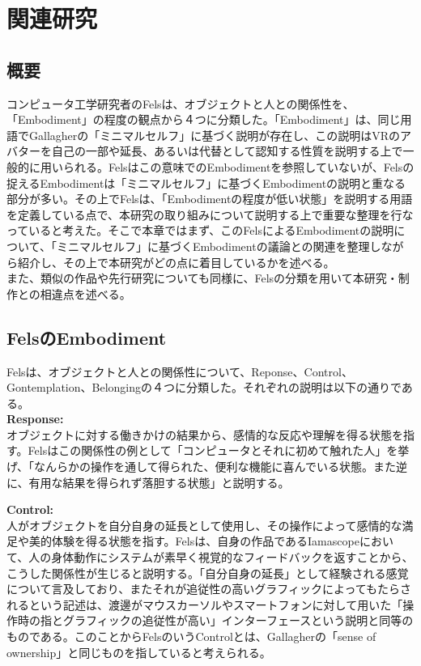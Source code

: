 \chapter{関連研究}
\label{related_works}
\section{概要}
コンピュータ工学研究者のFelsは、オブジェクトと人との関係性を、「Embodiment」の程度の観点から４つに分類した\cite{Fels}。「Embodiment」は、同じ用語でGallagher\cite{Gallagher2000}の「ミニマルセルフ」に基づく説明が存在し、この説明はVRのアバターを自己の一部や延長、あるいは代替として認知する性質を説明する上で一般的に用いられる。Felsはこの意味でのEmbodimentを参照していないが、Felsの捉えるEmbodimentは「ミニマルセルフ」に基づくEmbodimentの説明と重なる部分が多い。その上でFelsは、「Embodimentの程度が低い状態」を説明する用語を定義している点で、本研究の取り組みについて説明する上で重要な整理を行なっていると考えた。そこで本章ではまず、このFelsによるEmbodimentの説明について、「ミニマルセルフ」に基づくEmbodimentの議論との関連を整理しながら紹介し、その上で本研究がどの点に着目しているかを述べる。\\
また、類似の作品や先行研究についても同様に、Felsの分類を用いて本研究・制作との相違点を述べる。\\

\section{FelsのEmbodiment}
Felsは、オブジェクトと人との関係性について、Reponse、Control、Gontemplation、Belongingの４つに分類した。それぞれの説明は以下の通りである。\\

\textbf{Response:}\\
オブジェクトに対する働きかけの結果から、感情的な反応や理解を得る状態を指す。Felsはこの関係性の例として「コンピュータとそれに初めて触れた人」を挙げ、「なんらかの操作を通して得られた、便利な機能に喜んでいる状態。また逆に、有用な結果を得られず落胆する状態」と説明する。

\textbf{Control:}\\
人がオブジェクトを自分自身の延長として使用し、その操作によって感情的な満足や美的体験を得る状態を指す。Felsは、自身の作品であるIamascopeにおいて、人の身体動作にシステムが素早く視覚的なフィードバックを返すことから、こうした関係性が生じると説明する。「自分自身の延長」として経験される感覚について言及しており、またそれが追従性の高いグラフィックによってもたらされるという記述は、渡邊がマウスカーソルやスマートフォンに対して用いた「操作時の指とグラフィックの追従性が高い」インターフェースという説明と同等のものである。このことからFelsのいうControlとは、Gallagherの「sense of ownership」と同じものを指していると考えられる。

